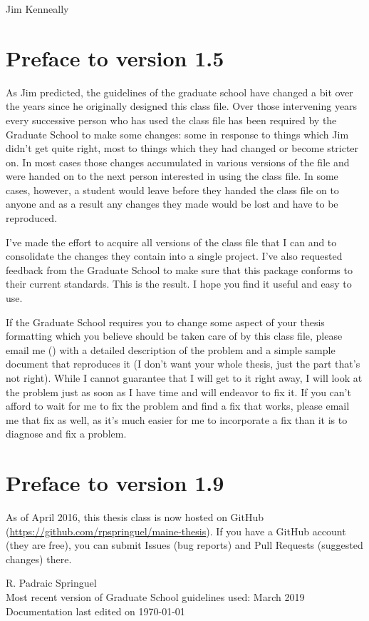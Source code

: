 \begin{preface}
 \begin{flushright}
 Jim Kenneally
 \end{flushright}
 
\section{Preface to version 1.5}
As Jim predicted, the guidelines of the graduate school have changed a bit over the years since he originally designed this class file.  Over those intervening years every successive person who has used the class file has been required by the Graduate School to make some changes: some in response to things which Jim didn't get quite right, most to things which they had changed or become stricter on.  In most cases those changes accumulated in various versions of the file and were handed on to the next person interested in using the class file.  In some cases, however, a student would leave before they handed the class file on to anyone and as a result any changes they made would be lost and have to be reproduced.

I've made the effort to acquire all versions of the class file that I can and to consolidate the changes they contain into a single project.  I've also requested feedback from the Graduate School to make sure that this package conforms to their current standards.  This is the result.  I hope you find it useful and easy to use.

If the Graduate School requires you to change some aspect of your thesis formatting which you believe should be taken care of by this class file, please email me (\email) with a detailed description of the problem and a simple sample document that reproduces it (I don't want your whole thesis, just the part that's not right).  While I cannot guarantee that I will get to it right away, I will look at the problem just as soon as I have time and will endeavor to fix it.  If you can't afford to wait for me to fix the problem and find a fix that works, please email me that fix as well, as it's much easier for me to incorporate a fix than it is to diagnose and fix a problem.

\section{Preface to version 1.9}
As of April 2016, this thesis class is now hosted on GitHub (\url{https://github.com/rpspringuel/maine-thesis}).  If you have a GitHub account (they are free), you can submit Issues (bug reports) and Pull Requests (suggested changes) there.

\begin{flushright}
R. Padraic Springuel\\
Most recent version of Graduate School guidelines used: March 2019\\
Documentation last edited on \today
\end{flushright}

\end{preface}

